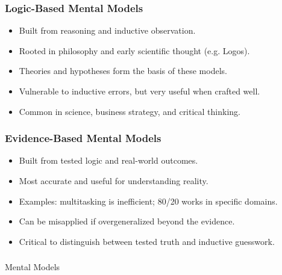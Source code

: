 \begin{frame}[fragile]\frametitle{Logic-Based Mental Models}
      \begin{itemize}
        \item Built from reasoning and inductive observation.
        \item Rooted in philosophy and early scientific thought (e.g. Logos).
        \item Theories and hypotheses form the basis of these models.
        \item Vulnerable to inductive errors, but very useful when crafted well.
        \item Common in science, business strategy, and critical thinking.
      \end{itemize}
\end{frame}

\begin{frame}[fragile]\frametitle{Evidence-Based Mental Models}
      \begin{itemize}
        \item Built from tested logic and real-world outcomes.
        \item Most accurate and useful for understanding reality.
        \item Examples: multitasking is inefficient; 80/20 works in specific domains.
        \item Can be misapplied if overgeneralized beyond the evidence.
        \item Critical to distinguish between tested truth and inductive guesswork.
      \end{itemize}
\end{frame}




\begin{frame}[fragile]\frametitle{}
\begin{center}
{\Large Mental Models}
\end{center}
\end{frame}

